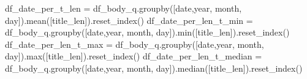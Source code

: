 \documentclass[
  letterpaper,
  DIV=11,
  numbers=noendperiod]{scrartcl}
\newenvironment{Shaded}{\begin{snugshade}}{\end{snugshade}}
\newcommand{\BuiltInTok}[1]{\textcolor[rgb]{0.00,0.23,0.31}{#1}}
\newcommand{\NormalTok}[1]{\textcolor[rgb]{0.00,0.23,0.31}{#1}}
\newcommand{\OperatorTok}[1]{\textcolor[rgb]{0.37,0.37,0.37}{#1}}
\newcommand{\StringTok}[1]{\textcolor[rgb]{0.13,0.47,0.30}{#1}}
\begin{document}
\begin{Shaded}
\begin{Highlighting}[]
\NormalTok{df\_date\_per\_t\_len         }\OperatorTok{=}\NormalTok{ df\_body\_q.groupby([}\StringTok{\textquotesingle{}date\textquotesingle{}}\NormalTok{,}\StringTok{\textquotesingle{}year\textquotesingle{}}\NormalTok{, }\StringTok{\textquotesingle{}month\textquotesingle{}}\NormalTok{, }\StringTok{\textquotesingle{}day\textquotesingle{}}\NormalTok{]).mean([}\StringTok{\textquotesingle{}title\_len\textquotesingle{}}\NormalTok{]).reset\_index()}
\NormalTok{df\_date\_per\_len\_t\_min     }\OperatorTok{=}\NormalTok{ df\_body\_q.groupby([}\StringTok{\textquotesingle{}date\textquotesingle{}}\NormalTok{,}\StringTok{\textquotesingle{}year\textquotesingle{}}\NormalTok{, }\StringTok{\textquotesingle{}month\textquotesingle{}}\NormalTok{, }\StringTok{\textquotesingle{}day\textquotesingle{}}\NormalTok{]).}\BuiltInTok{min}\NormalTok{([}\StringTok{\textquotesingle{}title\_len\textquotesingle{}}\NormalTok{]).reset\_index()}
\NormalTok{df\_date\_per\_len\_t\_max     }\OperatorTok{=}\NormalTok{ df\_body\_q.groupby([}\StringTok{\textquotesingle{}date\textquotesingle{}}\NormalTok{,}\StringTok{\textquotesingle{}year\textquotesingle{}}\NormalTok{, }\StringTok{\textquotesingle{}month\textquotesingle{}}\NormalTok{, }\StringTok{\textquotesingle{}day\textquotesingle{}}\NormalTok{]).}\BuiltInTok{max}\NormalTok{([}\StringTok{\textquotesingle{}title\_len\textquotesingle{}}\NormalTok{]).reset\_index()}
\NormalTok{df\_date\_per\_len\_t\_median  }\OperatorTok{=}\NormalTok{ df\_body\_q.groupby([}\StringTok{\textquotesingle{}date\textquotesingle{}}\NormalTok{,}\StringTok{\textquotesingle{}year\textquotesingle{}}\NormalTok{, }\StringTok{\textquotesingle{}month\textquotesingle{}}\NormalTok{, }\StringTok{\textquotesingle{}day\textquotesingle{}}\NormalTok{]).median([}\StringTok{\textquotesingle{}title\_len\textquotesingle{}}\NormalTok{]).reset\_index()}
\end{Highlighting}
\end{Shaded}
\end{document}
